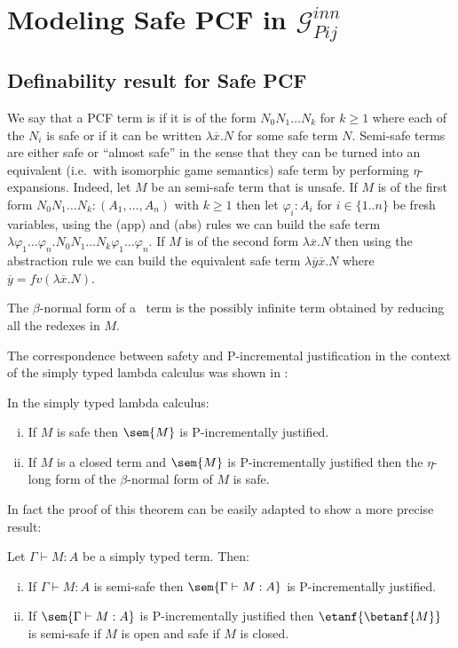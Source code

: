 \section{Modeling Safe PCF in $\mathcal{G}_{Pij}^{inn}$}

\subsection{Definability result for Safe PCF}

We say that a PCF term is  if it is of the form $N_0 N_1 \ldots N_k$ for $k\geq 1$ where each of the $N_i$ is safe or if it can be written $\lambda \overline{x} . N$ for some safe term $N$. Semi-safe terms are either safe or ``almost safe'' in the sense that they can be turned into an equivalent (i.e.~with isomorphic game semantics) safe term  by performing $\eta$-expansions. Indeed, let $M$ be an semi-safe term that is unsafe.
If $M$ is of the first form $N_0 N_1 \ldots N_k : (A_1,\ldots,A_n)$ with $k\geq 1$ then let $\varphi_i:A_i$ for $i\in\{1..n\}$ be fresh variables, using the (app) and (abs) rules we can build the safe term $\lambda \varphi_1 \ldots \varphi_n . N_0 N_1 \ldots N_k \varphi_1 \ldots \varphi_n$. If $M$ is of the second form $\lambda \overline{x} . N$ then using the abstraction rule we can build the equivalent safe term $\lambda \overline{y} \overline{x}. N$  where $\overline{y} = fv(\lambda \overline{x}. N)$.

The $\beta$-normal form of a \pcf\ term is the possibly infinite term obtained by reducing all the redexes in $M$.

The correspondence between safety and P-incremental justification in the context of the simply typed lambda calculus was shown
in \cite[Theorem 3(ii)]{blumong:safelambdacalculus}:

\begin{theorem}
\label{thm:safeincrejust} In the simply typed lambda calculus:
\begin{enumerate}[(i)]
\item If $M$ is safe then $\sem{M}$ is P-incrementally justified.
\item If $M$ is a closed term and $\sem{M}$ is
  P-incrementally justified then the $\eta$-long form of the
  $\beta$-normal form of $M$ is safe.
\end{enumerate}
\end{theorem}
In fact the proof of this theorem can be easily adapted to show a more precise result:
\begin{theorem}
\label{thm:semisafeincrejust} Let $\Gamma \vdash M : A$ be a simply typed term. Then:
\begin{enumerate}[(i)]
\item If $\Gamma \vdash M : A$ is semi-safe then $\sem{\Gamma \vdash M : A}$ is P-incrementally justified.
\item If $\sem{\Gamma \vdash M : A}$ is
  P-incrementally justified then
$\etanf{\betanf{M}}$ is semi-safe if $M$ is open
and safe if $M$ is closed.
\end{enumerate}
\end{theorem}



